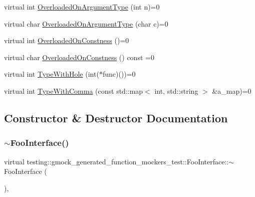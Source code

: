 \begin{DoxyCompactItemize}
\item 
virtual int \mbox{\hyperlink{classtesting_1_1gmock__generated__function__mockers__test_1_1FooInterface_ad9cc9a11570403fb8378ed6620892ec6}{Overloaded\+On\+Argument\+Type}} (int n)=0
\item 
virtual char \mbox{\hyperlink{classtesting_1_1gmock__generated__function__mockers__test_1_1FooInterface_a8cb6caa44216ba29fc228b016523abe9}{Overloaded\+On\+Argument\+Type}} (char c)=0
\item 
virtual int \mbox{\hyperlink{classtesting_1_1gmock__generated__function__mockers__test_1_1FooInterface_afbbe6ec72ae237de05e109dea5b03f4f}{Overloaded\+On\+Constness}} ()=0
\item 
virtual char \mbox{\hyperlink{classtesting_1_1gmock__generated__function__mockers__test_1_1FooInterface_ab40007385078cdb675616a21ef254df4}{Overloaded\+On\+Constness}} () const =0
\item 
virtual int \mbox{\hyperlink{classtesting_1_1gmock__generated__function__mockers__test_1_1FooInterface_a9e92ef227dc68806f85ebff9c8a6102a}{Type\+With\+Hole}} (int($\ast$func)())=0
\item 
virtual int \mbox{\hyperlink{classtesting_1_1gmock__generated__function__mockers__test_1_1FooInterface_a64544adcb9c502a8fbc3990b53f4c767}{Type\+With\+Comma}} (const std\+::map$<$ int, std\+::string $>$ \&a\+\_\+map)=0
\end{DoxyCompactItemize}


\subsection{Constructor \& Destructor Documentation}
\mbox{\label{classtesting_1_1gmock__generated__function__mockers__test_1_1FooInterface_ad4eb4709c9ae9b1cdaded8d05567cdbb}} 
\subsubsection{\texorpdfstring{$\sim$FooInterface()}{~FooInterface()}}
{\footnotesize\ttfamily virtual testing\+::gmock\+\_\+generated\+\_\+function\+\_\+mockers\+\_\+test\+::\+Foo\+Interface\+::$\sim$\+Foo\+Interface (\begin{DoxyParamCaption}{ }\end{DoxyParamCaption})\hspace{0.3cm}{\ttfamily [inline]}, {\ttfamily [virtual]}}



